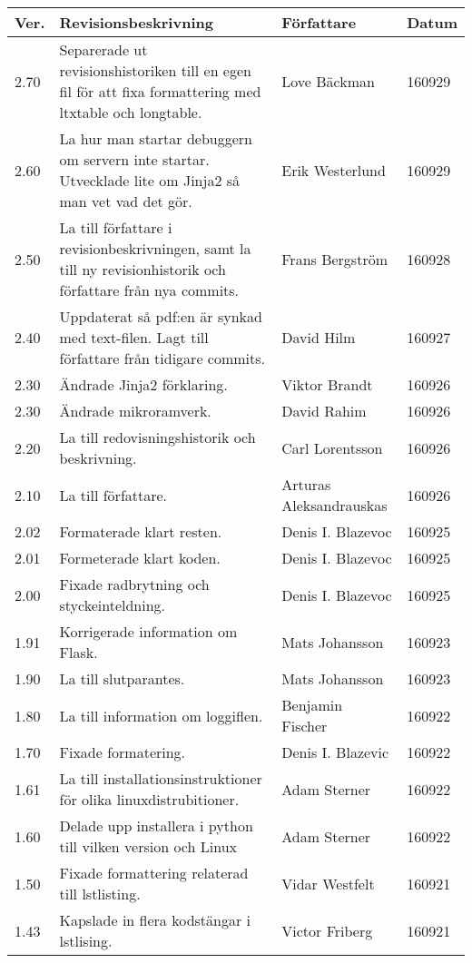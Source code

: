 \begin{longtable}{|l|X|l|l|}
\hline
Ver. & Revisionsbeskrivning & Författare & Datum \\\hline
2.70 & Separerade ut revisionshistoriken till en egen fil för att fixa formattering med ltxtable och longtable. & Love Bäckman & 160929 \\\hline
2.60 & La hur man startar debuggern om servern inte startar. Utvecklade lite om Jinja2 så man vet vad det gör. & Erik Westerlund & 160929 \\\hline
2.50 & La till författare i revisionbeskrivningen, samt la till ny revisionhistorik och författare från nya commits. & Frans Bergström & 160928 \\\hline
2.40 & Uppdaterat så pdf:en är synkad med text-filen. Lagt till författare från tidigare commits. & David Hilm & 160927 \\\hline
2.30 & Ändrade Jinja2 förklaring. & Viktor Brandt & 160926 \\\hline
2.30 & Ändrade mikroramverk. & David Rahim & 160926 \\\hline
2.20 & La till redovisningshistorik och beskrivning. & Carl Lorentsson & 160926 \\\hline
2.10 & La till författare. & Arturas Aleksandrauskas & 160926 \\\hline
2.02 & Formaterade klart resten. & Denis I. Blazevoc & 160925 \\\hline
2.01 & Formeterade klart koden. & Denis I. Blazevoc & 160925 \\\hline
2.00 & Fixade radbrytning och styckeinteldning. & Denis I. Blazevoc & 160925 \\\hline
1.91 & Korrigerade information om Flask. & Mats Johansson & 160923 \\\hline
1.90 & La till slutparantes. & Mats Johansson & 160923 \\\hline
1.80 & La till information om loggiflen. & Benjamin Fischer & 160922 \\\hline
1.70 & Fixade formatering. & Denis I. Blazevic & 160922 \\\hline
1.61 & La till installationsinstruktioner för olika linuxdistrubitioner. & Adam Sterner & 160922 \\\hline
1.60 & Delade upp installera i python till vilken version och Linux & Adam Sterner & 160922 \\\hline
1.50 & Fixade formattering relaterad till lstlisting. & Vidar Westfelt & 160921 \\\hline
1.43 & Kapslade in flera kodstängar i lstlising. & Victor Friberg & 160921 \\\hline

\end{longtable}
